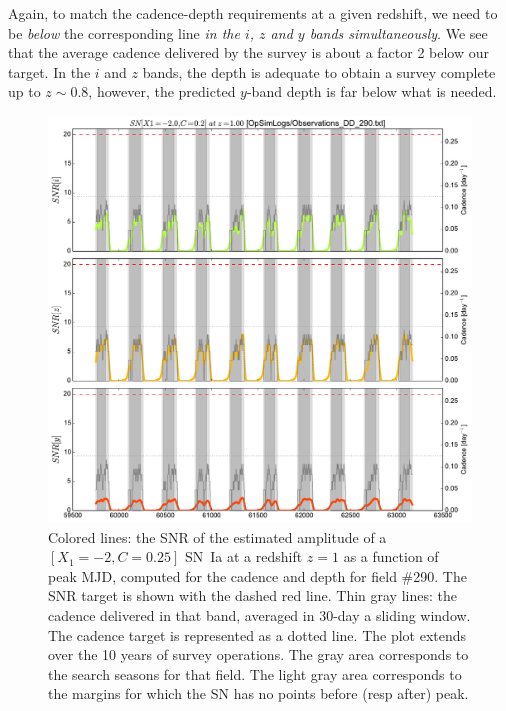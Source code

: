 \documentclass[\docopts]{\docclass}
\begin{document}
Again, to match the cadence-depth requirements at a given redshift, we need
to be {\em below} the corresponding line {\em in the $i$, $z$ and $y$
  bands simultaneously}. We see that the average cadence delivered by
the survey is about a factor 2 below our target. In the $i$ and $z$
bands, the depth is adequate to obtain a survey complete up to $z \sim
0.8$, however, the predicted $y$-band depth is far below what is
needed.


\begin{figure}[t]
  \begin{center}
    \includegraphics[width=\linewidth]{metric_DD_290.pdf}
    \caption{Colored lines: the SNR of the estimated amplitude of a
      $[X_1=-2, C=0.25]$ SN~Ia at a redshift $z = 1$ as a function of
      peak MJD, computed for the  cadence and depth
      for field \#290. The SNR target is shown with the dashed red
      line.  Thin gray lines: the cadence delivered in that band,
      averaged in 30-day a sliding window.  The cadence target is
      represented as a dotted line. The plot extends over the 10 years
      of survey operations. The gray area corresponds to the search
      seasons for that field. The light gray area corresponds to the
      margins for which the SN has no points before (resp after)
      peak.}
    \label{fig:snr_metric}
  \end{center}
\end{figure}
\end{document}
